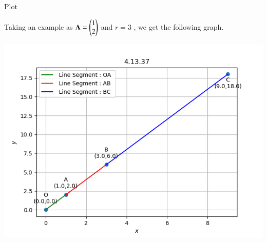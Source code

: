 \documentclass{beamer}
\begin{document}
\begin{frame}{Plot}

Taking an example as $\mathbf{A} = \begin{pmatrix}1 \\ 2\end{pmatrix}$ and $r=3$ , we get the following graph.

    \centering
    \includegraphics[width=\columnwidth, height=0.7\textheight, keepaspectratio]{../figs/colli1.png}   
\end{frame}
\end{document}
